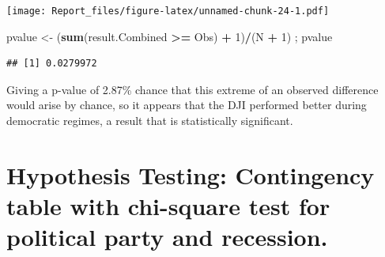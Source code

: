 \documentclass[]{article}
\newenvironment{Shaded}{\begin{snugshade}}{\end{snugshade}}
\newcommand{\CommentTok}[1]{\textcolor[rgb]{0.56,0.35,0.01}{\textit{#1}}}
\newcommand{\DecValTok}[1]{\textcolor[rgb]{0.00,0.00,0.81}{#1}}
\newcommand{\KeywordTok}[1]{\textcolor[rgb]{0.13,0.29,0.53}{\textbf{#1}}}
\newcommand{\NormalTok}[1]{#1}
\newcommand{\OperatorTok}[1]{\textcolor[rgb]{0.81,0.36,0.00}{\textbf{#1}}}
\newcommand{\StringTok}[1]{\textcolor[rgb]{0.31,0.60,0.02}{#1}}
\begin{document}
\texttt{[image: Report\_files/figure-latex/unnamed-chunk-24-1.pdf]}

\begin{Shaded}
\begin{Highlighting}[]
\NormalTok{pvalue <-}\StringTok{  }\NormalTok{(}\KeywordTok{sum}\NormalTok{(result.Combined }\OperatorTok{>=}\StringTok{ }\NormalTok{Obs) }\OperatorTok{+}\StringTok{ }\DecValTok{1}\NormalTok{)}\OperatorTok{/}\NormalTok{(N }\OperatorTok{+}\StringTok{ }\DecValTok{1}\NormalTok{) ; pvalue}
\end{Highlighting}
\end{Shaded}

\begin{verbatim}
## [1] 0.0279972
\end{verbatim}

Giving a p-value of 2.87\% chance that this extreme of an observed
difference would arise by chance, so it appears that the DJI performed
better during democratic regimes, a result that is statistically
significant.

\hypertarget{hypothesis-testing-contingency-table-with-chi-square-test-for-political-party-and-recession.}{%
\section{Hypothesis Testing: Contingency table with chi-square test for
political party and
recession.}\label{hypothesis-testing-contingency-table-with-chi-square-test-for-political-party-and-recession.}}

\begin{Shaded}
\end{Shaded}
\end{document}
